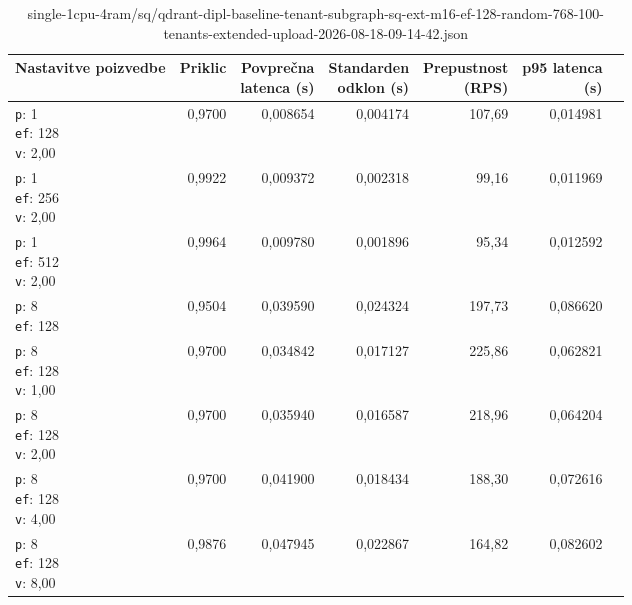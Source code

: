 \begin{table}[htbp]
  \centering
\small
  \caption{single-1cpu-4ram/sq/qdrant-dipl-baseline-tenant-subgraph-sq-ext-m16-ef-128-random-768-100-tenants-extended-upload-2026-08-18-09-14-42.json}
  \label{tab:single-1cpu-4ram:sq:qdrant-dipl-baseline-tenant-subgraph-sq-ext-m16-ef-128-random-768-100-tenants-extended-upload-2026-08-18-09-14-42.json}
  \begin{tabularx}{\textwidth}{Xrrrrrr}
    \toprule
    Nastavitve poizvedbe & Priklic & \makecell{Povprečna\\latenca (s)} & \makecell{Standarden\\odklon (s)} & \makecell{Prepustnost\\(RPS)} & \makecell{p95 latenca\\(s)}  \\
    \midrule
    \makecell{\texttt{p}: 1\\\texttt{ef}: 128\\\texttt{v}: 2,00} & 0,9700 & 0,008654 & 0,004174 & 107,69 & 0,014981 \\
    \makecell{\texttt{p}: 1\\\texttt{ef}: 256\\\texttt{v}: 2,00} & 0,9922 & 0,009372 & 0,002318 & 99,16 & 0,011969 \\
    \makecell{\texttt{p}: 1\\\texttt{ef}: 512\\\texttt{v}: 2,00} & 0,9964 & 0,009780 & 0,001896 & 95,34 & 0,012592 \\
    \makecell{\texttt{p}: 8\\\texttt{ef}: 128} & 0,9504 & 0,039590 & 0,024324 & 197,73 & 0,086620 \\
    \makecell{\texttt{p}: 8\\\texttt{ef}: 128\\\texttt{v}: 1,00} & 0,9700 & 0,034842 & 0,017127 & 225,86 & 0,062821 \\
    \makecell{\texttt{p}: 8\\\texttt{ef}: 128\\\texttt{v}: 2,00} & 0,9700 & 0,035940 & 0,016587 & 218,96 & 0,064204 \\
    \makecell{\texttt{p}: 8\\\texttt{ef}: 128\\\texttt{v}: 4,00} & 0,9700 & 0,041900 & 0,018434 & 188,30 & 0,072616 \\
    \makecell{\texttt{p}: 8\\\texttt{ef}: 128\\\texttt{v}: 8,00} & 0,9876 & 0,047945 & 0,022867 & 164,82 & 0,082602 \\

\end{tabularx}
\end{table}
